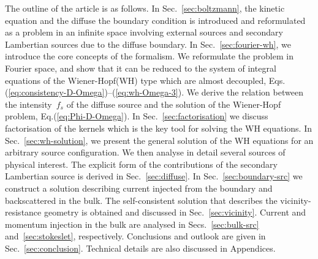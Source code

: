 \documentclass[preprint,aps,eqsecnum, prb]{revtex4-1}
\begin{document}
The outline of the article is as follows. In Sec.~\ref{sec:boltzmann},
the kinetic equation and the diffuse the boundary condition is introduced
and reformulated as a problem in an infinite space involving external
sources and secondary Lambertian sources due to the diffuse boundary.
In Sec.~\ref{sec:fourier-wh}, we introduce the core concepts of the formalism.
We reformulate the problem in Fourier space, and show that
it can be reduced to the system of integral equations of the
Wiener-Hopf(WH) type which are almost decoupled,
Eqs.(\ref{eq:consistency-D-Omega})--(\ref{eq:wh-Omega-3}).
We derive the relation between the intensity~$f_s$ of the diffuse source
and the solution of the  Wiener-Hopf problem, Eq.(\ref{eq:Phi-D-Omega}).
In Sec.~\ref{sec:factorisation} we discuss factorisation of the
kernels which is the key tool for solving the WH equations.
In Sec.~\ref{sec:wh-solution},
we present the general solution of the WH
equations for an arbitrary source configuration.
We then analyse in detail several sources of physical interest. 
The explicit form of the contributions of the secondary
Lambertian source is derived in Sec.~\ref{sec:diffuse}.
In Sec.~\ref{sec:boundary-src} we construct a solution describing current
injected from the boundary and backscattered in the bulk.
The self-consistent solution that describes the vicinity-resistance geometry
is obtained and discussed in Sec.~\ref{sec:vicinity}.
Current and momentum injection in the bulk
are analysed in Secs.~\ref{sec:bulk-src} and~\ref{sec:stokeslet}, respectively.
Conclusions and outlook are given in Sec.~\ref{sec:conclusion}.
Technical details are also discussed in Appendices. 
\end{document}
